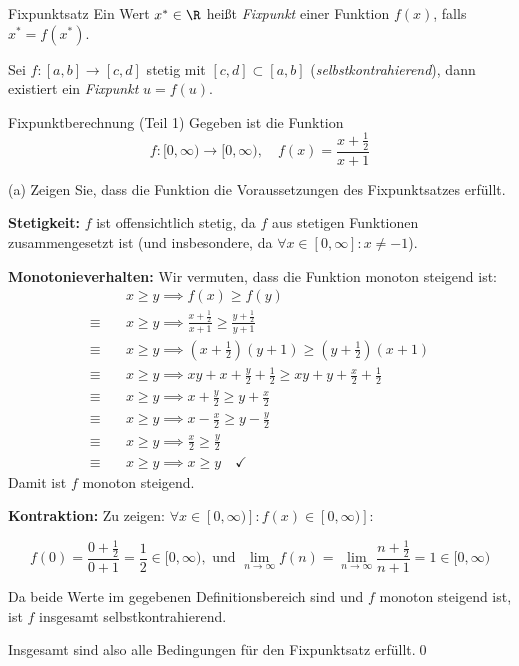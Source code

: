 \documentclass[german]{../spicker}
\begin{document}
\begin{defi}{Fixpunktsatz}
    Ein Wert $x^* \in \R$ heißt \emph{Fixpunkt} einer Funktion $f(x)$, falls $x^* = f(x^*)$.

    Sei $f : [a, b] \to [c, d]$ stetig mit $[c, d] \subset [a, b]$ (\emph{selbstkontrahierend}), dann existiert ein \emph{Fixpunkt} $u = f(u)$.
\end{defi}

\begin{example}{Fixpunktberechnung (Teil 1)}
    Gegeben ist die Funktion
    $$f: [0,\infty) \to [0, \infty), \quad f(x) = \frac{x+\frac{1}{2}}{x+1}$$

    (a) Zeigen Sie, dass die Funktion die Voraussetzungen des Fixpunktsatzes erfüllt.

    \textbf{Stetigkeit:}
    $f$ ist offensichtlich stetig, da $f$ aus stetigen Funktionen zusammengesetzt ist (und insbesondere, da $\forall x\in [0,\infty]: x\neq -1$).

    \textbf{Monotonieverhalten:}
    Wir vermuten, dass die Funktion monoton steigend ist:
    $$
        \begin{aligned}
                         & x \geq y \implies f(x) \geq f(y)                                                           \\
            \equiv \quad & x \geq y \implies \frac{x+\frac{1}{2}}{x+1} \geq \frac{y+\frac{1}{2}}{y+1}                 \\
            \equiv \quad & x \geq y \implies \left(x+\frac{1}{2}\right)(y+1) \geq \left(y+\frac{1}{2}\right)(x+1)     \\
            \equiv \quad & x \geq y \implies xy+ x + \frac{y}{2}+ \frac{1}{2} \geq xy + y + \frac{x}{2} + \frac{1}{2} \\
            \equiv \quad & x \geq y \implies x + \frac{y}{2}\geq y + \frac{x}{2}                                      \\
            \equiv \quad & x \geq y \implies x - \frac{x}{2}\geq y - \frac{y}{2}                                      \\
            \equiv \quad & x \geq y \implies \frac{x}{2}\geq \frac{y}{2}                                              \\
            \equiv \quad & x \geq y \implies x\geq y \quad \checkmark
        \end{aligned}
    $$
    Damit ist $f$ monoton steigend.

    \textbf{Kontraktion:} Zu zeigen: $\forall x\in [0,\infty)]: f(x) \in [0,\infty)]$:

    $$f(0) = \frac{0+\frac{1}{2}}{0+1} = \frac{1}{2}\in [0,\infty), \text{ und } \lim_{n\to\infty} f(n) = \lim_{n\to\infty} \frac{n+\frac{1}{2}}{n+1} = 1\in [0,\infty)$$

    Da beide Werte im gegebenen Definitionsbereich sind und $f$ monoton steigend ist, ist $f$ insgesamt selbstkontrahierend.

    Insgesamt sind also alle Bedingungen für den Fixpunktsatz erfüllt.\qed

\end{example}
\end{document}
